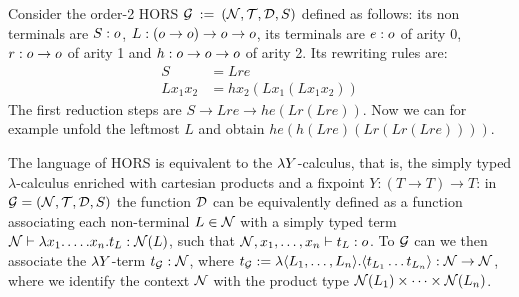 %
\begin{example}
	Consider the order-2 HORS $\mathcal{G} \: := \: {(\mathcal{N}, \mathcal{T}, \mathcal{D}, S)}$ defined as follows: its non terminals  are $S:o$, $L: (o \to o) \to o \to o$, its terminals are $e: o$ of arity 0, $r:o \to o$ of arity 1 and $h:o \to o \to o $ of arity 2. Its rewriting rules are:
	\begin{align*}
		S& = L r e\\
		 L x_1x_2 & = h x_2 (L x_1 (L x_1 x_2))   
	\end{align*}
	The first reduction steps are $S \to L r e \to h e (L r (L r e))$. Now we can for example unfold the leftmost $L$ and obtain $ h e (h (L r e) (L r (L r (L r e))))$.
\end{example}


The language of HORS is equivalent to the $\lambda Y$-calculus, that is, the simply typed $\lambda$-calculus enriched with cartesian products and a fixpoint $Y:(T\to T)\to T$: 
in $\mathcal{G}=(\mathcal{N}, \mathcal{T}, \mathcal{D}, S)$ the function $\mathcal{D}$ can be equivalently defined as a
function associating each non-terminal $L\in \mathcal{N}$ with a simply typed term 
$\mathcal{N}\vdash \lambda x_1.\dots. x_n. t_L:\mathcal{N}(L)$, such that $\mathcal{N}, x_1,\dots, x_n\vdash t_L:o$. 
To $\mathcal{G}$ can we then associate the $\lambda Y$-term
$t_{\mathcal{G}}:\mathcal{N}$, where 
$t_{\mathcal{G}}:= \lambda \langle L_1,\dots, L_n\rangle. \langle  t_{L_1} \dots  t_{L_n}\rangle: \mathcal{N}\to \mathcal{N}$, where we identify the context $\mathcal{N}$ with the product type $\mathcal{N}(L_1)\times\dots\times\mathcal{N}(L_n)$. 



